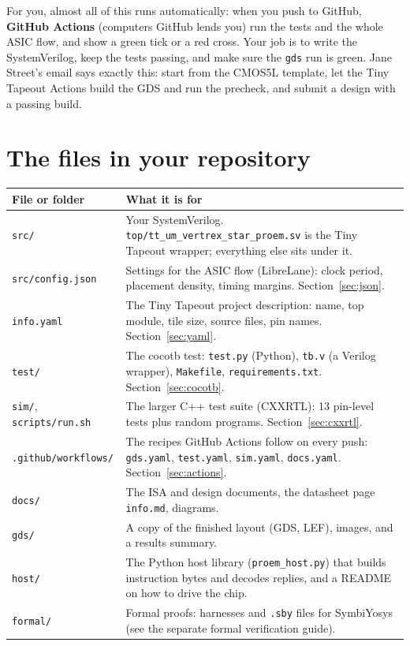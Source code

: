 \documentclass[11pt,a4paper]{article}
\newcommand{\file}[1]{\texttt{#1}}
\newcommand{\cmd}[1]{\texttt{#1}}
\begin{document}
For you, almost all of this runs automatically: when you push to GitHub, \textbf{GitHub Actions} (computers GitHub lends you) run the tests and the whole ASIC flow, and show a green tick or a red cross. Your job is to write the SystemVerilog, keep the tests passing, and make sure the \cmd{gds} run is green. Jane Street's email says exactly this: start from the CMOS5L template, let the Tiny Tapeout Actions build the GDS and run the precheck, and submit a design with a passing build.

\section{The files in your repository}

\begin{center}
\begin{tabularx}{\linewidth}{@{}lX@{}}
\toprule
File or folder & What it is for \\
\midrule
\file{src/} & Your SystemVerilog. \file{top/tt\_um\_vertrex\_star\_proem.sv} is the Tiny Tapeout wrapper; everything else sits under it. \\
\file{src/config.json} & Settings for the ASIC flow (LibreLane): clock period, placement density, timing margins. Section~\ref{sec:json}. \\
\file{info.yaml} & The Tiny Tapeout project description: name, top module, tile size, source files, pin names. Section~\ref{sec:yaml}. \\
\file{test/} & The cocotb test: \file{test.py} (Python), \file{tb.v} (a Verilog wrapper), \file{Makefile}, \file{requirements.txt}. Section~\ref{sec:cocotb}. \\
\file{sim/}, \file{scripts/run.sh} & The larger C++ test suite (CXXRTL): 13 pin-level tests plus random programs. Section~\ref{sec:cxxrtl}. \\
\file{.github/workflows/} & The recipes GitHub Actions follow on every push: \file{gds.yaml}, \file{test.yaml}, \file{sim.yaml}, \file{docs.yaml}. Section~\ref{sec:actions}. \\
\file{docs/} & The ISA and design documents, the datasheet page \file{info.md}, diagrams. \\
\file{gds/} & A copy of the finished layout (GDS, LEF), images, and a results summary. \\
\file{host/} & The Python host library (\file{proem\_host.py}) that builds instruction bytes and decodes replies, and a README on how to drive the chip. \\
\file{formal/} & Formal proofs: harnesses and \file{.sby} files for SymbiYosys (see the separate formal verification guide). \\
\bottomrule
\end{tabularx}
\end{center}
\end{document}
